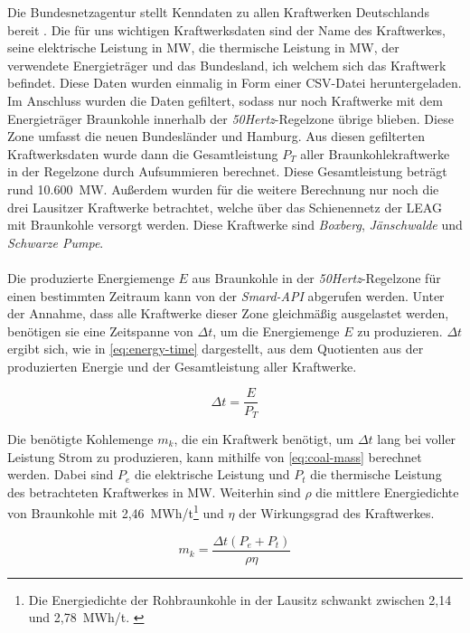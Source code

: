 Die Bundesnetzagentur stellt Kenndaten zu allen Kraftwerken Deutschlands bereit \cite{noauthor_bundesnetzagentur_nodate}. Die für uns wichtigen Kraftwerksdaten sind der Name des Kraftwerkes, seine elektrische Leistung in MW, die thermische Leistung in MW, der verwendete Energieträger und das Bundesland, ich welchem sich das Kraftwerk befindet. Diese Daten wurden einmalig in Form einer CSV-Datei heruntergeladen. Im Anschluss wurden die Daten gefiltert, sodass nur noch Kraftwerke mit dem Energieträger Braunkohle innerhalb der \emph{50Hertz}-Regelzone übrige blieben. Diese Zone umfasst die neuen Bundesländer und Hamburg. Aus diesen gefilterten Kraftwerksdaten wurde dann die Gesamtleistung $P_T$ aller Braunkohlekraftwerke in der Regelzone durch Aufsummieren berechnet. Diese Gesamtleistung beträgt rund 10.600~MW. Außerdem wurden für die weitere Berechnung nur noch die drei Lausitzer Kraftwerke betrachtet, welche über das Schienennetz der LEAG mit Braunkohle versorgt werden. Diese Kraftwerke sind \emph{Boxberg}, \emph{Jänschwalde} und \emph{Schwarze Pumpe}.\\
\\
Die produzierte Energiemenge $E$ aus Braunkohle in der \emph{50Hertz}-Regelzone für einen bestimmten Zeitraum kann von der \emph{Smard-API} abgerufen werden. Unter der Annahme, dass alle Kraftwerke dieser Zone gleichmäßig ausgelastet werden, benötigen sie eine Zeitspanne von $\Delta t$, um die Energiemenge $E$ zu produzieren. $\Delta t$ ergibt sich, wie in \autoref{eq:energy-time} dargestellt, aus dem Quotienten aus der produzierten Energie und der Gesamtleistung aller Kraftwerke.

\begin{equation}
    \Delta t = \frac{E}{P_T}\label{eq:energy-time}
\end{equation}

Die benötigte Kohlemenge $m_k$, die ein Kraftwerk benötigt, um $\Delta t$ lang bei voller Leistung Strom zu produzieren, kann mithilfe von \autoref{eq:coal-mass} berechnet werden. Dabei sind $P_e$ die elektrische Leistung und $P_t$ die thermische Leistung des betrachteten Kraftwerkes in MW. Weiterhin sind $\rho$ die mittlere Energiedichte von Braunkohle mit 2,46~MWh/t\footnote{Die Energiedichte der Rohbraunkohle in der Lausitz schwankt zwischen 2,14 und 2,78~MWh/t. \cite{bundesverband_braunkohle_braunkohle_nodate}} und $\eta$ der Wirkungsgrad des Kraftwerkes.

\begin{equation}
    m_k=\frac{\Delta t(P_e+P_t)}{\rho\eta}\label{eq:coal-mass}
\end{equation}

